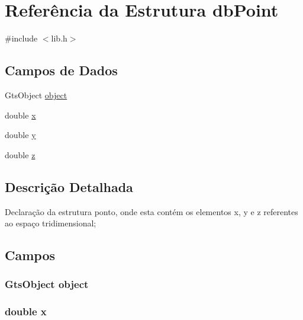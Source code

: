 \hypertarget{structdbPoint}{}\section{Referência da Estrutura db\+Point}
\label{structdbPoint}


{\ttfamily \#include $<$lib.\+h$>$}

\subsection*{Campos de Dados}
\begin{DoxyCompactItemize}
\item 
Gts\+Object \hyperlink{structdbPoint_a4c9ad028a3c5d740f1fc0b15669c1c0f}{object}
\item 
double \hyperlink{structdbPoint_af88b946fb90d5f08b5fb740c70e98c10}{x}
\item 
double \hyperlink{structdbPoint_ab927965981178aa1fba979a37168db2a}{y}
\item 
double \hyperlink{structdbPoint_ab3e6ed577a7c669c19de1f9c1b46c872}{z}
\end{DoxyCompactItemize}


\subsection{Descrição Detalhada}
Declaração da estrutura ponto, onde esta contém os elementos x, y e z referentes ao espaço tridimensional; 

\subsection{Campos}
\subsubsection[{\texorpdfstring{object}{object}}]{\setlength{\rightskip}{0pt plus 5cm}Gts\+Object object}\hypertarget{structdbPoint_a4c9ad028a3c5d740f1fc0b15669c1c0f}{}\label{structdbPoint_a4c9ad028a3c5d740f1fc0b15669c1c0f}
\subsubsection[{\texorpdfstring{x}{x}}]{\setlength{\rightskip}{0pt plus 5cm}double x}\hypertarget{structdbPoint_af88b946fb90d5f08b5fb740c70e98c10}{}\label{structdbPoint_af88b946fb90d5f08b5fb740c70e98c10}
